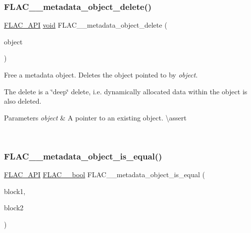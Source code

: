 \subsubsection{\texorpdfstring{FLAC\_\_metadata\_object\_delete()}{FLAC\_\_metadata\_object\_delete()}}
{\footnotesize\ttfamily \mbox{\hyperlink{group__flac__export_ga56ca07df8a23310707732b1c0007d6f5}{F\+L\+A\+C\+\_\+\+A\+PI}} \mbox{\hyperlink{_s_d_l__opengles2__gl2ext_8h_ae5d8fa23ad07c48bb609509eae494c95}{void}} F\+L\+A\+C\+\_\+\+\_\+metadata\+\_\+object\+\_\+delete (\begin{DoxyParamCaption}\item[{\mbox{\hyperlink{struct_f_l_a_c_____stream_metadata}{F\+L\+A\+C\+\_\+\+\_\+\+Stream\+Metadata}} $\ast$}]{object }\end{DoxyParamCaption})}

Free a metadata object. Deletes the object pointed to by {\itshape object}.

The delete is a \char`\"{}deep\char`\"{} delete, i.\+e. dynamically allocated data within the object is also deleted.


\begin{DoxyParams}{Parameters}
{\em object} & A pointer to an existing object. \textbackslash{}assert 
\begin{DoxyCode}{1}
\end{DoxyCode}
 \\
\hline
\end{DoxyParams}
\mbox{\label{group__flac__metadata__object_gac834137d4837c304ca5db4c8407900bb}} 
\subsubsection{\texorpdfstring{FLAC\_\_metadata\_object\_is\_equal()}{FLAC\_\_metadata\_object\_is\_equal()}}
{\footnotesize\ttfamily \mbox{\hyperlink{group__flac__export_ga56ca07df8a23310707732b1c0007d6f5}{F\+L\+A\+C\+\_\+\+A\+PI}} \mbox{\hyperlink{ordinals_8h_a95103469f1cbd78b8cf250194985b34e}{F\+L\+A\+C\+\_\+\+\_\+bool}} F\+L\+A\+C\+\_\+\+\_\+metadata\+\_\+object\+\_\+is\+\_\+equal (\begin{DoxyParamCaption}\item[{const \mbox{\hyperlink{struct_f_l_a_c_____stream_metadata}{F\+L\+A\+C\+\_\+\+\_\+\+Stream\+Metadata}} $\ast$}]{block1,  }\item[{const \mbox{\hyperlink{struct_f_l_a_c_____stream_metadata}{F\+L\+A\+C\+\_\+\+\_\+\+Stream\+Metadata}} $\ast$}]{block2 }\end{DoxyParamCaption})}

